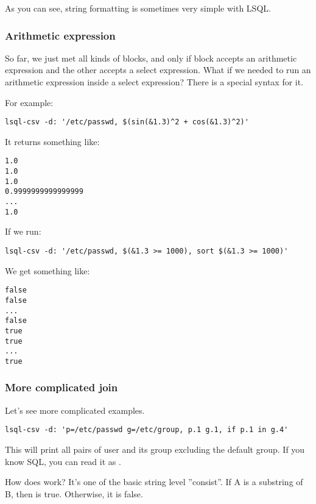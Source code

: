 As you can see, string formatting is sometimes very simple with LSQL.

\subsubsection{Arithmetic expression}
So far, we just met all kinds of blocks, and only if block accepts an arithmetic expression and the other accepts a select expression.
What if we needed to run an arithmetic expression inside a select expression? There is a special syntax \icode{\$(\ldots)} for it.

For example:
\begin{verbatim}
lsql-csv -d: '/etc/passwd, $(sin(&1.3)^2 + cos(&1.3)^2)'
\end{verbatim}

It returns something like:
\begin{verbatim}
1.0
1.0
1.0
0.9999999999999999
...
1.0
\end{verbatim}

If we run:
\begin{verbatim}
lsql-csv -d: '/etc/passwd, $(&1.3 >= 1000), sort $(&1.3 >= 1000)'
\end{verbatim}

We get something like:
\begin{verbatim}
false
false
...
false
true
true
...
true
\end{verbatim}

\subsubsection{More complicated join}
Let's see more complicated examples.
\begin{verbatim}
lsql-csv -d: 'p=/etc/passwd g=/etc/group, p.1 g.1, if p.1 in g.4'
\end{verbatim}
This will print all pairs of user and its group excluding the default group. If you know SQL, you can read it as .

How does  work? It's one of the basic string level ''consist''. If A is a substring of B, then  is true. Otherwise, it is false.


